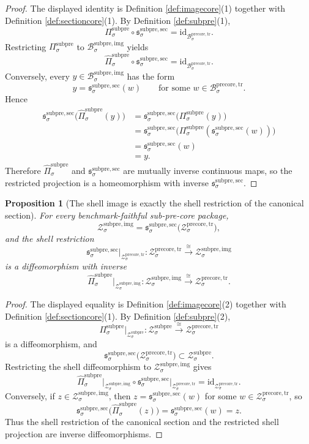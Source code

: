 \documentclass[11pt]{article}
\newcommand{\PreCoreTrBody}[1]{\mathcal B_{#1}^{\mathrm{precore,tr}}}
\newcommand{\PreCoreTrShell}[1]{\mathcal Z_{#1}^{\mathrm{precore,tr}}}
\newcommand{\SubPreCoreProj}[1]{\Pi_{#1}^{\mathrm{subpre}}}
\newcommand{\SubPreCoreShellSet}[1]{\mathcal Z_{#1}^{\mathrm{subpre}}}
\newcommand{\SubPreImgBody}[1]{\mathcal B_{#1}^{\mathrm{subpre,img}}}
\newcommand{\SubPreImgProj}[1]{\widehat{\Pi}_{#1}^{\mathrm{subpre}}}
\newcommand{\SubPreImgShell}[1]{\mathcal Z_{#1}^{\mathrm{subpre,img}}}
\newcommand{\SubPreSection}[1]{\mathfrak s_{#1}^{\mathrm{subpre,sec}}}
\newtheorem{proposition}{Proposition}
\begin{document}
\begin{proof}
The displayed identity is Definition \ref{def:imagecore}(1) together with Definition \ref{def:sectioncore}(1). By Definition \ref{def:subpre}(1),
\[
\SubPreCoreProj{\sigma}\circ\SubPreSection{\sigma}
=
\mathrm{id}_{\PreCoreTrBody{\sigma}}.
\]
Restricting \(\SubPreCoreProj{\sigma}\) to \(\SubPreImgBody{\sigma}\) yields
\[
\SubPreImgProj{\sigma}\circ\SubPreSection{\sigma}
=
\mathrm{id}_{\PreCoreTrBody{\sigma}}.
\]
Conversely, every \(y\in\SubPreImgBody{\sigma}\) has the form
\[
y=\SubPreSection{\sigma}(w)
\qquad
\text{for some }
w\in\PreCoreTrBody{\sigma}.
\]
Hence
\begin{align*}
\SubPreSection{\sigma}\bigl(\SubPreImgProj{\sigma}(y)\bigr)
&=
\SubPreSection{\sigma}\bigl(\SubPreCoreProj{\sigma}(y)\bigr)\\
&=
\SubPreSection{\sigma}\bigl(\SubPreCoreProj{\sigma}(\SubPreSection{\sigma}(w))\bigr)\\
&=
\SubPreSection{\sigma}(w)\\
&=
y.
\end{align*}
Therefore \(\SubPreImgProj{\sigma}\) and \(\SubPreSection{\sigma}\) are mutually inverse continuous maps, so the restricted projection is a homeomorphism with inverse \(\SubPreSection{\sigma}\).
\end{proof}

\begin{proposition}[The shell image is exactly the shell restriction of the canonical section]
\label{prop:reconstructshell}
For every benchmark-faithful sub-pre-core package,
\[
\SubPreImgShell{\sigma}
=
\SubPreSection{\sigma}\bigl(\PreCoreTrShell{\sigma}\bigr),
\]
and the shell restriction
\[
\SubPreSection{\sigma}\big|_{\PreCoreTrShell{\sigma}}
:
\PreCoreTrShell{\sigma}\xrightarrow{\cong}\SubPreImgShell{\sigma}
\]
is a diffeomorphism with inverse
\[
\SubPreImgProj{\sigma}\big|_{\SubPreImgShell{\sigma}}
:
\SubPreImgShell{\sigma}\xrightarrow{\cong}\PreCoreTrShell{\sigma}.
\]
\end{proposition}

\begin{proof}
The displayed equality is Definition \ref{def:imagecore}(2) together with Definition \ref{def:sectioncore}(1). By Definition \ref{def:subpre}(2),
\[
\SubPreCoreProj{\sigma}\big|_{\SubPreCoreShellSet{\sigma}}
:
\SubPreCoreShellSet{\sigma}\xrightarrow{\cong}\PreCoreTrShell{\sigma}
\]
is a diffeomorphism, and
\[
\SubPreSection{\sigma}\bigl(\PreCoreTrShell{\sigma}\bigr)
\subset
\SubPreCoreShellSet{\sigma}.
\]
Restricting the shell diffeomorphism to \(\SubPreImgShell{\sigma}\) gives
\[
\SubPreImgProj{\sigma}\big|_{\SubPreImgShell{\sigma}}
\circ
\SubPreSection{\sigma}\big|_{\PreCoreTrShell{\sigma}}
=
\mathrm{id}_{\PreCoreTrShell{\sigma}}.
\]
Conversely, if \(z\in\SubPreImgShell{\sigma}\), then \(z=\SubPreSection{\sigma}(w)\) for some \(w\in\PreCoreTrShell{\sigma}\), so
\[
\SubPreSection{\sigma}\bigl(\SubPreImgProj{\sigma}(z)\bigr)
=
\SubPreSection{\sigma}(w)
=
z.
\]
Thus the shell restriction of the canonical section and the restricted shell projection are inverse diffeomorphisms.
\end{proof}
\end{document}
